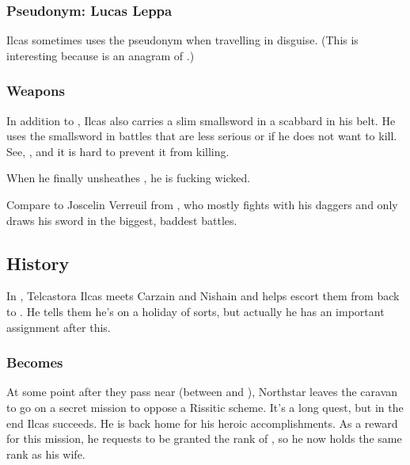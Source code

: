 \subsubsection{Pseudonym: Lucas Leppa}
Ilcas sometimes uses the pseudonym  when travelling in disguise. 
(This is interesting because  is an anagram of .)




\subsubsection{Weapons}
In addition to , Ilcas also carries a slim smallsword in a scabbard in his belt. 
He uses the smallsword in battles that are less serious or if he does not want to kill. 
See, , and it is hard to prevent it from killing. 

When he finally unsheathes \Telderain, he is fucking wicked. 

Compare to Joscelin Verreuil from \cite{JacquelineCarey:KushielsLegacy}, who mostly fights with his daggers and only draws his sword in the biggest, baddest battles. 









\subsection{History}
In , Telcastora Ilcas meets Carzain and Nishain and helps escort them from \Scyrum{} back to \Redglen. 
He tells them he's on a holiday of sorts, but actually he has an important assignment after this. 





\subsubsection{Becomes \Retaxis}
\index{\Retaxis}
At some point after they pass near \Redglen{} (between  and ), Northstar leaves the caravan to go on a secret mission to oppose a Rissitic scheme. 
It's a long quest, but in the end Ilcas succeeds. 
He is \honoured back home for his heroic accomplishments.
As a reward for this mission, he requests to be granted the \honorary rank of \Retaxis, so he now holds the same rank as his wife. 

